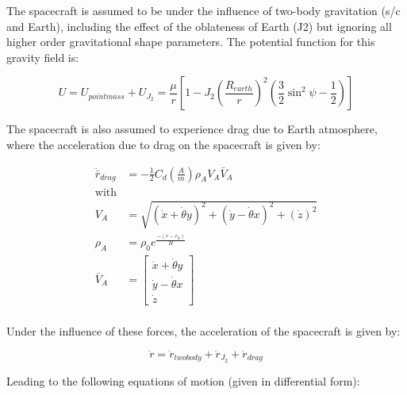 \documentclass[10pt]{article}
\begin{document}
The spacecraft is assumed to be under the influence of two-body gravitation (s/c and Earth), including the effect of the oblateness of Earth (J2) but ignoring all higher order gravitational shape parameters. The potential function for this gravity field is:

\begin{equation}
 U = U_{pointmass} + U_{J_2} =  \frac{\mu}{r}\left[ 1 - J_2\left(\frac{R_{earth}}{r}\right)^2 \left(\frac{3}{2}\sin^2{\psi} - \frac{1}{2}\right) \right]
\end{equation}

The spacecraft is also assumed to experience drag due to Earth atmosphere, where the acceleration due to drag on the spacecraft is given by:

\begin{equation}
\begin{split}
\ddot{\bar{r}}_{drag} & =  - \frac{1}{2} C_d \left( \frac{A}{m}\right) \rho_A V_A \bar{V}_A\\
\text{with}\\
V_A & = \sqrt{ (\dot{x} +  \dot{\theta}y)^2 + (\dot{y} -  \dot{\theta}x)^2 + (\dot{z})^2 } \\
\rho_A & = \rho_0 e^{\frac{-(r-r_0)}{H}} \\
\bar{V}_A & = 
    \begin{bmatrix} 
     \dot{x} +  \dot{\theta}y \\
     \dot{y} -  \dot{\theta}x\\
     \dot{z}    
     \end{bmatrix} \\
\end{split}
\end{equation}

Under the influence of these forces, the acceleration of the spacecraft is given by:

\begin{equation}
\ddot{r} =  \ddot{r}_{twobody} + \ddot{r}_{J_2} + \ddot{r}_{drag} 
\end{equation}

Leading to the following equations of motion (given in differential form):
\end{document}
